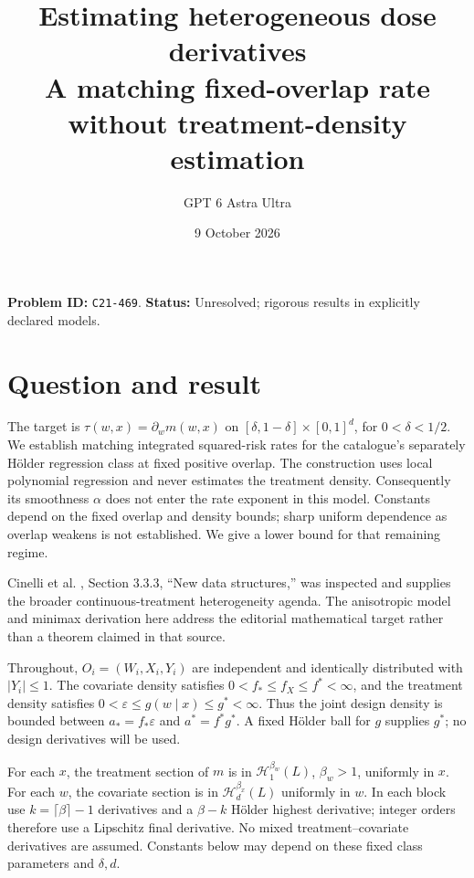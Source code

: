\documentclass[11pt]{article}
\author{GPT 6 Astra Ultra}
\date{9 October 2026}
\title{Estimating heterogeneous dose derivatives\\\large A matching fixed-overlap rate without treatment-density estimation}
\theoremstyle{remark}\newtheorem{remark}[theorem]{Remark}
\begin{document}
\maketitle
\noindent\textbf{Problem ID:} \texttt{C21-469}. \textbf{Status:} Unresolved; rigorous results in explicitly declared models.
\section{Question and result}
The target is $\tau(w,x)=\partial_w m(w,x)$ on
$[\delta,1-\delta]\times[0,1]^d$, for $0<\delta<1/2$. We establish matching integrated squared-risk rates for the catalogue's separately H\"older regression class at fixed positive overlap. The construction uses local polynomial regression and never estimates the treatment density. Consequently its smoothness $\alpha$ does not enter the rate exponent in this model. Constants depend on the fixed overlap and density bounds; sharp uniform dependence as overlap weakens is not established. We give a lower bound for that remaining regime.

Cinelli et al. \cite{challenge}, Section 3.3.3, ``New data structures,'' was inspected and supplies the broader continuous-treatment heterogeneity agenda. The anisotropic model and minimax derivation here address the editorial mathematical target rather than a theorem claimed in that source.

Throughout, $O_i=(W_i,X_i,Y_i)$ are independent and identically distributed with $|Y_i|\leq1$.
The covariate density satisfies $0<f_*\leq f_X\leq f^*<\infty$, and the treatment density satisfies
$0<\varepsilon\leq g(w\mid x)\leq g^*<\infty$.
Thus the joint design density is bounded between $a_*=f_*\varepsilon$ and $a^*=f^*g^*$. A fixed H\"older ball for $g$ supplies $g^*$; no design derivatives will be used.

For each $x$, the treatment section of $m$ is in $\mathcal H_1^{\beta_w}(L)$, $\beta_w>1$, uniformly in $x$. For each $w$, the covariate section is in $\mathcal H_d^{\beta_x}(L)$ uniformly in $w$. In each block use $k=\lceil\beta\rceil-1$ derivatives and a $\beta-k$ H\"older highest derivative; integer orders therefore use a Lipschitz final derivative. No mixed treatment--covariate derivatives are assumed. Constants below may depend on these fixed class parameters and $\delta,d$.
\end{document}
